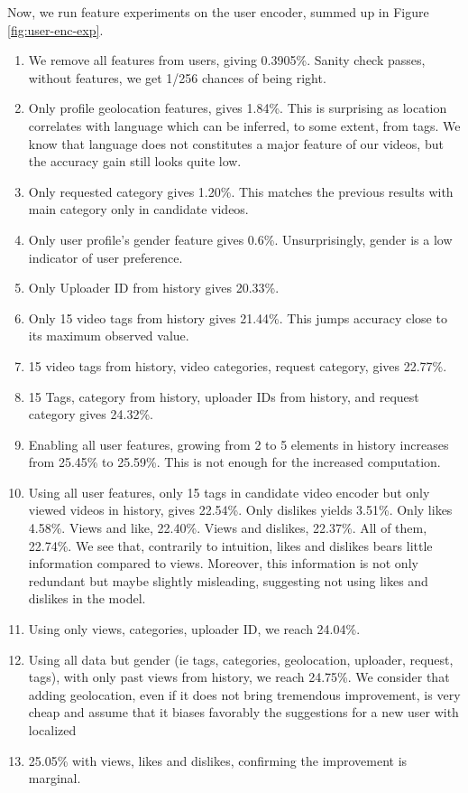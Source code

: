 Now, we run feature experiments on the user encoder, summed up in Figure \ref{fig:user-enc-exp}.

\begin{enumerate}
    \item We remove all features from users, giving 0.3905\%. Sanity check passes, without features, we get 1/256 chances of being right.
    \item Only profile geolocation features, gives 1.84\%. This is surprising as location correlates with language which can be inferred, to some extent, from tags. We know that language does not constitutes a major feature of our videos, but the accuracy gain still looks quite low.
    \item Only requested category gives 1.20\%. This matches the previous results with main category only in candidate videos.
    \item Only user profile's gender feature gives 0.6\%. Unsurprisingly, gender is a low indicator of user preference.
    \item Only Uploader ID from history gives 20.33\%.
    \item Only 15 video tags from history gives 21.44\%. This jumps accuracy close to its maximum observed value.
    \item 15 video tags from history, video categories, request category, gives 22.77\%.
    \item 15 Tags, category from history, uploader IDs from history, and request category gives 24.32\%.
    \item Enabling all user features, growing from 2 to 5 elements in history increases from 25.45\% to 25.59\%. This is not enough for the increased computation.
    \item Using all user features, only 15 tags in candidate video encoder but only viewed videos in history, gives 22.54\%. Only dislikes yields 3.51\%. Only likes 4.58\%. Views and like, 22.40\%. Views and dislikes, 22.37\%. All of them, 22.74\%. We see that, contrarily to intuition, likes and dislikes bears little information compared to views. Moreover, this information is not only redundant but maybe slightly misleading, suggesting not using likes and dislikes in the model.
    \item Using only views, categories, uploader ID, we reach 24.04\%.
    \item Using all data but gender (ie tags, categories, geolocation, uploader, request, tags), with only past views from history, we reach 24.75\%. We consider that adding geolocation, even if it does not bring tremendous improvement, is very cheap and assume that it biases favorably the suggestions for a new user with localized 
    \item 25.05\% with views, likes and dislikes, confirming the improvement is marginal.
\end{enumerate}

